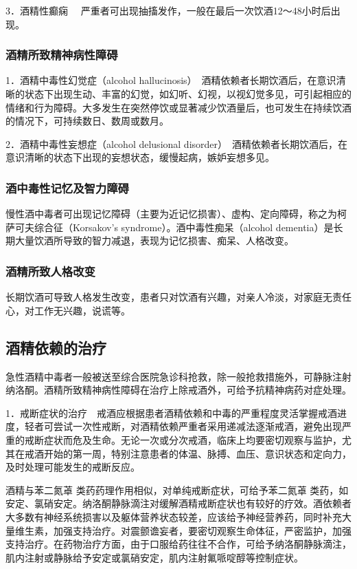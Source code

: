 3．酒精性癫痫
　严重者可出现抽搐发作，一般在最后一次饮酒12～48小时后出现。

\subsubsection{酒精所致精神病性障碍}

1．酒精中毒性幻觉症（alcohol
hallucinosis）　酒精依赖者长期饮酒后，在意识清晰的状态下出现生动、丰富的幻觉，如幻听、幻视，以视幻觉多见，可引起相应的情绪和行为障碍。大多发生在突然停饮或显著减少饮酒量后，也可发生在持续饮酒的情况下，可持续数日、数周或数月。

2．酒精中毒性妄想症（alcohol delusional
disorder）　酒精依赖者长期饮酒后，在意识清晰的状态下出现的妄想状态，缓慢起病，嫉妒妄想多见。

\subsubsection{酒中毒性记忆及智力障碍}

慢性酒中毒者可出现记忆障碍（主要为近记忆损害）、虚构、定向障碍，称之为柯萨可夫综合征（Korsakov's
syndrome）。酒中毒性痴呆（alcohol
dementia）是长期大量饮酒所导致的智力减退，表现为记忆损害、痴呆、人格改变。

\subsubsection{酒精所致人格改变}

长期饮酒可导致人格发生改变，患者只对饮酒有兴趣，对亲人冷淡，对家庭无责任心，对工作无兴趣，说谎等。

\subsection{酒精依赖的治疗}

急性酒精中毒者一般被送至综合医院急诊科抢救，除一般抢救措施外，可静脉注射纳洛酮。酒精所致精神病性障碍在治疗上除戒酒外，可给予抗精神病药对症处理。

1．戒断症状的治疗　戒酒应根据患者酒精依赖和中毒的严重程度灵活掌握戒酒进度，轻者可尝试一次性戒断，对酒精依赖严重者采用递减法逐渐戒酒，避免出现严重的戒断症状而危及生命。无论一次或分次戒酒，临床上均要密切观察与监护，尤其在戒酒开始的第一周，特别注意患者的体温、脉搏、血压、意识状态和定向力，及时处理可能发生的戒断反应。

酒精与苯二氮䓬
类药药理作用相似，对单纯戒断症状，可给予苯二氮䓬
类药，如安定、氯硝安定。纳洛酮静脉滴注对缓解酒精戒断症状也有较好的疗效。酒依赖者大多数有神经系统损害以及躯体营养状态较差，应该给予神经营养药，同时补充大量维生素，加强支持治疗。对震颤谵妄者，要密切观察生命体征，严密监护，加强支持治疗。在药物治疗方面，由于口服给药往往不合作，可给予纳洛酮静脉滴注，肌内注射或静脉给予安定或氯硝安定，肌内注射氟哌啶醇等控制症状。

